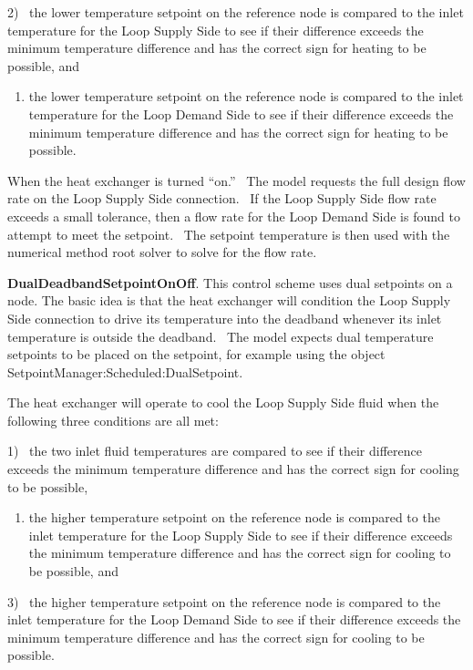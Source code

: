 2)~ the lower temperature setpoint on the reference node is compared to the inlet temperature for the Loop Supply Side to see if their difference exceeds the minimum temperature difference and has the correct sign for heating to be possible, and

\begin{enumerate}
\def\labelenumi{\arabic{enumi})}
\setcounter{enumi}{2}
\tightlist
\item
  the lower temperature setpoint on the reference node is compared to the inlet temperature for the Loop Demand Side to see if their difference exceeds the minimum temperature difference and has the correct sign for heating to be possible.
\end{enumerate}

When the heat exchanger is turned ``on.''~ The model requests the full design flow rate on the Loop Supply Side connection.~ If the Loop Supply Side flow rate exceeds a small tolerance, then a flow rate for the Loop Demand Side is found to attempt to meet the setpoint.~ The setpoint temperature is then used with the numerical method root solver to solve for the flow rate.

\textbf{DualDeadbandSetpointOnOff}. This control scheme uses dual setpoints on a node. The basic idea is that the heat exchanger will condition the Loop Supply Side connection to drive its temperature into the deadband whenever its inlet temperature is outside the deadband.~ The model expects dual temperature setpoints to be placed on the setpoint, for example using the object SetpointManager:Scheduled:DualSetpoint.

The heat exchanger will operate to cool the Loop Supply Side fluid when the following three conditions are all met:

1)~ the two inlet fluid temperatures are compared to see if their difference exceeds the minimum temperature difference and has the correct sign for cooling to be possible,

\begin{enumerate}
\def\labelenumi{\arabic{enumi})}
\setcounter{enumi}{1}
\tightlist
\item
  the higher temperature setpoint on the reference node is compared to the inlet temperature for the Loop Supply Side to see if their difference exceeds the minimum temperature difference and has the correct sign for cooling to be possible, and
\end{enumerate}

3)~ the higher temperature setpoint on the reference node is compared to the inlet temperature for the Loop Demand Side to see if their difference exceeds the minimum temperature difference and has the correct sign for cooling to be possible.


